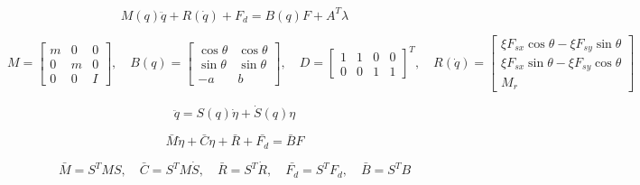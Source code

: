 \begin{equation}
\label{eq:dinamiceqgeneral}
    M(q)\ddot q+
R(\dot q)+F_d = B(q)F + A^T\lambda 
\end{equation}

\begin{equation*}
M=\begin{bmatrix}
m & 0 & 0\\ 
0 & m & 0\\ 
0 & 0 & I
\end{bmatrix},\quad
B(q)=\begin{bmatrix}
\cos\theta  & \cos\theta \\
\sin\theta  & \sin\theta \\
-a &  b
\end{bmatrix},\quad
D=\begin{bmatrix}
1 & 1 & 0 & 0\\ 
0 & 0 & 1 & 1
\end{bmatrix}^T, \quad
R(\dot q)=\begin{bmatrix}
\xi F_{sx}\cos\theta-\xi F_{sy}\sin\theta \\ 
\xi F_{sx}\sin\theta-\xi F_{sy}\cos\theta\\ 
M_r
\end{bmatrix}
\end{equation*}

\begin{equation}
\label{eq:allapotokdupladerivalt}
    \ddot q = S(q) \dot\eta + \dot S(q)\eta 
\end{equation}

\begin{equation}
\label{eq:dinamicmodelgenericsimplified}
\bar{M}\dot\eta+\bar{C}\eta+\bar{R}+\bar{F_d}=\bar{B}F
\end{equation}

\begin{equation*}
\bar{M}=S^TMS, \quad
\bar{C}= S^TM \dot S, \quad
\bar{R}=S^T\dot R,  \quad
\bar{F_d}=S^TF_d,\quad
\bar{B}=S^TB 
\end{equation*}

